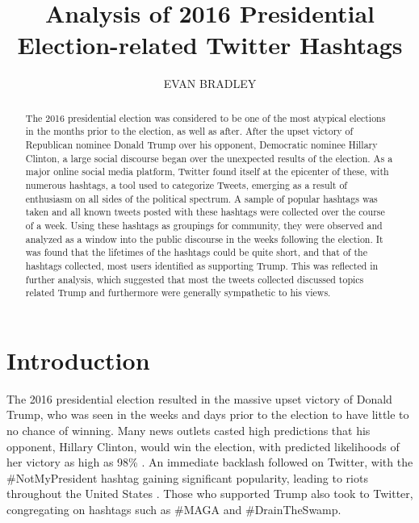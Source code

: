 \documentclass[prodmode]{acmsmall} %
\begin{document}

\title{Analysis of 2016 Presidential Election-related Twitter Hashtags}
\author{
  EVAN BRADLEY
}

\begin{abstract}
  The 2016 presidential election was considered to be one of the most atypical
  elections in the months prior to the election, as well as after. After the
  upset victory of Republican nominee Donald Trump over his opponent, Democratic
  nominee Hillary Clinton, a large social discourse began over the unexpected
  results of the election. As a major online social media platform, Twitter
  found itself at the epicenter of these, with numerous hashtags, a tool used to
  categorize Tweets, emerging as a result of enthusiasm on all sides of the
  political spectrum. A sample of popular hashtags was taken and all known
  tweets posted with these hashtags were collected over the course of a week.
  Using these hashtags as groupings for community, they were observed and
  analyzed as a window into the public discourse in the weeks following the
  election. It was found that the lifetimes of the hashtags could be quite
  short, and that of the hashtags collected, most users identified as supporting
  Trump. This was reflected in further analysis, which suggested that most the
  tweets collected discussed topics related Trump and furthermore were generally
  sympathetic to his views.
\end{abstract}


\maketitle

\section{Introduction} %
The 2016 presidential election resulted in the massive upset victory of Donald
Trump, who was seen in the weeks and days prior to the election to have little
to no chance of winning. Many news outlets casted high predictions that his
opponent, Hillary Clinton, would win the election, with predicted likelihoods of
her victory as high as 98\% \cite{huffpost}. An immediate backlash
followed on Twitter, with the \#NotMyPresident hashtag gaining significant
popularity, leading to riots throughout the United States \cite{riots}. Those
who supported Trump also took to Twitter, congregating on hashtags such as \#MAGA
and \#DrainTheSwamp.
\end{document}
